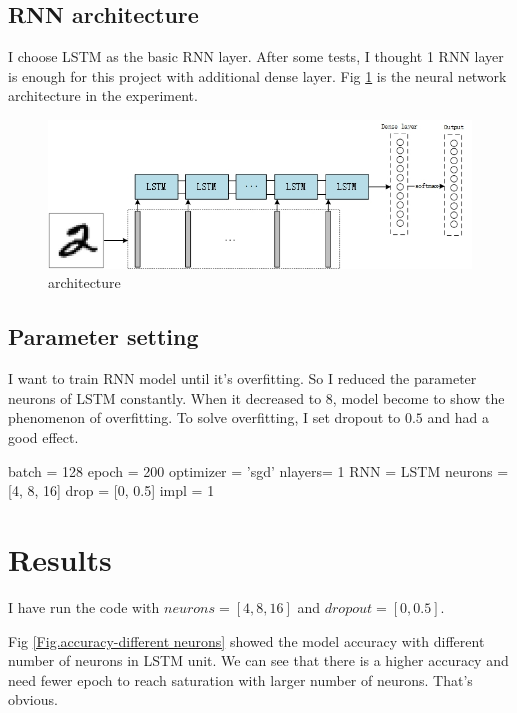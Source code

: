 \documentclass[a4paper,10pt]{article}
\begin{document}
\subsection{RNN architecture}
I choose LSTM\cite{doi:10.1162/neco.1997.9.8.1735} as the basic RNN layer. After some tests, I thought 1 RNN layer is enough for this project with additional dense layer.
Fig \ref{Fig.mnist-rnn} is the neural network architecture in the experiment.
\begin{figure}[htpb]
\centering 
\includegraphics[width=1\textwidth]{report_image/mnist-rnn.jpg} 
\caption{architecture} 
\label{Fig.mnist-rnn} 
\end{figure}

\subsection{Parameter setting}
I want to train RNN model until it's overfitting. So I reduced the parameter neurons of LSTM constantly. When it decreased to 8, model become to show the phenomenon of overfitting. To solve overfitting, I set dropout to $0.5$ and had a good effect.
\begin{python}
    batch = 128
    epoch = 200
    optimizer = 'sgd'
    nlayers= 1     
    RNN = LSTM
    neurons = [4, 8, 16]
    drop = [0, 0.5]
    impl = 1
\end{python}

\section{Results}
I have run the code with $neurons=[4, 8, 16]$ and $dropout=[0, 0.5]$.

Fig \ref{Fig.accuracy-different neurons} showed the model accuracy with different number of neurons in LSTM unit. We can see that there is a higher accuracy and need fewer epoch to reach saturation with larger number of neurons. That's obvious. 
\end{document}
